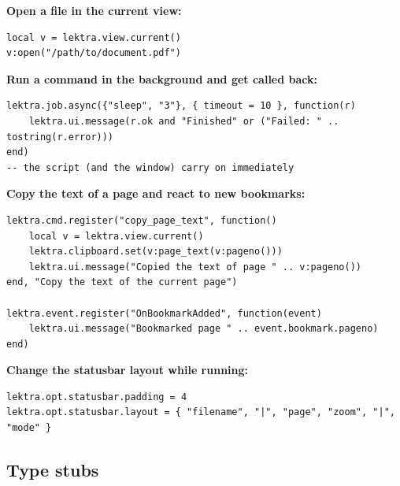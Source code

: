 \documentclass[a4paper,12pt]{article}
\begin{document}
\textbf{Open a file in the current view:}

\begin{tcolorbox}[colback=gray!5, colframe=gray!40, boxrule=0.4pt, arc=4pt,
    fontupper=\ttfamily\small]
\begin{verbatim}
local v = lektra.view.current()
v:open("/path/to/document.pdf")
\end{verbatim}
\end{tcolorbox}


\textbf{Run a command in the background and get called back:}

\begin{tcolorbox}[colback=gray!5, colframe=gray!40, boxrule=0.4pt, arc=4pt,
    fontupper=\ttfamily\small]
\begin{verbatim}
lektra.job.async({"sleep", "3"}, { timeout = 10 }, function(r)
    lektra.ui.message(r.ok and "Finished" or ("Failed: " .. tostring(r.error)))
end)
-- the script (and the window) carry on immediately
\end{verbatim}
\end{tcolorbox}


\textbf{Copy the text of a page and react to new bookmarks:}

\begin{tcolorbox}[colback=gray!5, colframe=gray!40, boxrule=0.4pt, arc=4pt,
    fontupper=\ttfamily\small]
\begin{verbatim}
lektra.cmd.register("copy_page_text", function()
    local v = lektra.view.current()
    lektra.clipboard.set(v:page_text(v:pageno()))
    lektra.ui.message("Copied the text of page " .. v:pageno())
end, "Copy the text of the current page")

lektra.event.register("OnBookmarkAdded", function(event)
    lektra.ui.message("Bookmarked page " .. event.bookmark.pageno)
end)
\end{verbatim}
\end{tcolorbox}

\textbf{Change the statusbar layout while running:}

\begin{tcolorbox}[colback=gray!5, colframe=gray!40, boxrule=0.4pt, arc=4pt,
    fontupper=\ttfamily\small]
\begin{verbatim}
lektra.opt.statusbar.padding = 4
lektra.opt.statusbar.layout = { "filename", "|", "page", "zoom", "|", "mode" }
\end{verbatim}
\end{tcolorbox}

\subsection{Type stubs}
\end{document}
